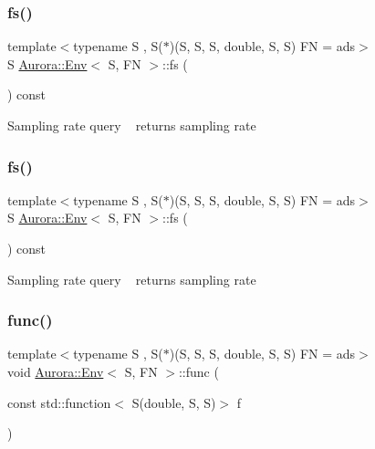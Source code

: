 \subsubsection{\texorpdfstring{fs()}{fs()}\hspace{0.1cm}{\footnotesize\ttfamily [1/2]}}
{\footnotesize\ttfamily template$<$typename S , S($\ast$)(\+S, S, S, double, S, S) FN = ads$>$ \\
S \hyperlink{class_aurora_1_1_env}{Aurora\+::\+Env}$<$ S, FN $>$\+::fs (\begin{DoxyParamCaption}{ }\end{DoxyParamCaption}) const\hspace{0.3cm}{\ttfamily [inline]}}

Sampling rate query ~\newline
returns sampling rate \mbox{\label{class_aurora_1_1_env_a8b83ca686cce4fc31b03b1de847bc062}} 
\subsubsection{\texorpdfstring{fs()}{fs()}\hspace{0.1cm}{\footnotesize\ttfamily [2/2]}}
{\footnotesize\ttfamily template$<$typename S , S($\ast$)(\+S, S, S, double, S, S) FN = ads$>$ \\
S \hyperlink{class_aurora_1_1_env}{Aurora\+::\+Env}$<$ S, FN $>$\+::fs (\begin{DoxyParamCaption}{ }\end{DoxyParamCaption}) const\hspace{0.3cm}{\ttfamily [inline]}}

Sampling rate query ~\newline
returns sampling rate \mbox{\label{class_aurora_1_1_env_a92aec91bb78127cf50d5d841870cce14}} 
\subsubsection{\texorpdfstring{func()}{func()}\hspace{0.1cm}{\footnotesize\ttfamily [1/2]}}
{\footnotesize\ttfamily template$<$typename S , S($\ast$)(\+S, S, S, double, S, S) FN = ads$>$ \\
void \hyperlink{class_aurora_1_1_env}{Aurora\+::\+Env}$<$ S, FN $>$\+::func (\begin{DoxyParamCaption}\item[{const std\+::function$<$ S(double, S, S)$>$}]{f }\end{DoxyParamCaption})\hspace{0.3cm}{\ttfamily [inline]}}

